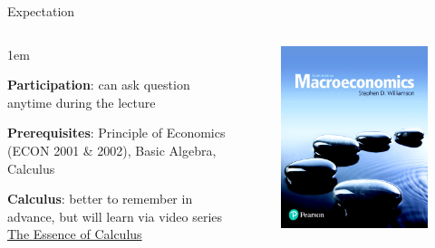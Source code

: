 \documentclass[11pt,aspectratio=43]{beamer}
\let\olditemize=\itemize
\let\endolditemize=\enditemize
\renewenvironment{itemize}{\olditemize \itemsep1em}{\endolditemize}
\theoremstyle{definition}
\begin{document}
\begin{frame}{Expectation}
\label{slide:Expectation}
    \begin{columns}
        \begin{column}{0.6\textwidth}
            \begin{itemize}
                \item \textbf{Participation}: can ask question anytime during the lecture
                \item \textbf{Prerequisites}: \alert{Principle of Economics}
                        (ECON 2001 \& 2002),
                        Basic Algebra, Calculus
                \item \textbf{Calculus}: better to remember in advance, but will learn via video series \alert{\href{https://www.youtube.com/watch?v=WUvTyaaNkzM&list=PLZHQObOWTQDMsr9K-rj53DwVRMYO3t5Yr}{The Essence of Calculus}}
            \end{itemize}
        \end{column}
        \begin{column}{0.4\textwidth}
            \begin{figure}
                \includegraphics[width=\textwidth]{./figures/Williamson.jpg}

\end{figure}
\end{column}
\end{columns}
\end{frame}
\end{document}
